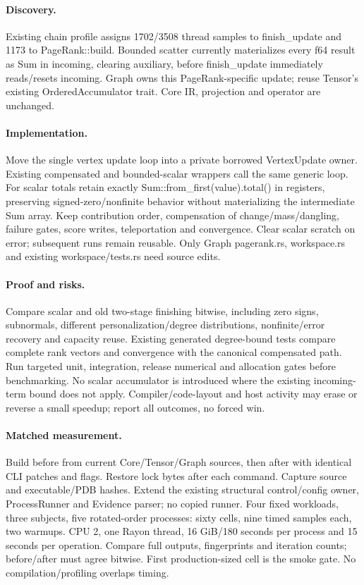 \documentclass[11pt,a4paper]{article}
\begin{document}
\paragraph{Discovery.} Existing chain profile assigns 1702/3508 thread samples to
finish\_update and 1173 to PageRank::build. Bounded scatter currently materializes every
f64 result as Sum in incoming, clearing auxiliary, before finish\_update immediately
reads/resets incoming. Graph owns this PageRank-specific update; reuse Tensor's existing
OrderedAccumulator trait. Core IR, projection and operator are unchanged.
\paragraph{Implementation.} Move the single vertex update loop into a private borrowed
VertexUpdate owner. Existing compensated and bounded-scalar wrappers call the same generic
loop. For scalar totals retain exactly Sum::from\_first(value).total() in registers, preserving
signed-zero/nonfinite behavior without materializing the intermediate Sum array.
Keep contribution order, compensation of change/mass/dangling, failure gates, score writes,
teleportation and convergence. Clear scalar scratch on error; subsequent runs remain reusable.
Only Graph pagerank.rs, workspace.rs and existing workspace/tests.rs need source edits.
\paragraph{Proof and risks.} Compare scalar and old two-stage finishing bitwise, including
zero signs, subnormals, different personalization/degree distributions, nonfinite/error
recovery and capacity reuse. Existing generated degree-bound tests compare complete rank
vectors and convergence with the canonical compensated path. Run targeted unit, integration,
release numerical and allocation gates before benchmarking. No scalar accumulator is
introduced where the existing incoming-term bound does not apply. Compiler/code-layout
and host activity may erase or reverse a small speedup; report all outcomes, no forced win.
\paragraph{Matched measurement.} Build before from current Core/Tensor/Graph sources,
then after with identical CLI patches and flags. Restore lock bytes after each command.
Capture source and executable/PDB hashes. Extend the existing structural control/config
owner, ProcessRunner and Evidence parser; no copied runner. Four fixed workloads, three
subjects, five rotated-order processes: sixty cells, nine timed samples each, two warmups.
CPU 2, one Rayon thread, 16 GiB/180 seconds per process and 15 seconds per operation.
Compare full outputs, fingerprints and iteration counts; before/after must agree bitwise.
First production-sized cell is the smoke gate. No compilation/profiling overlaps timing.
\end{document}
